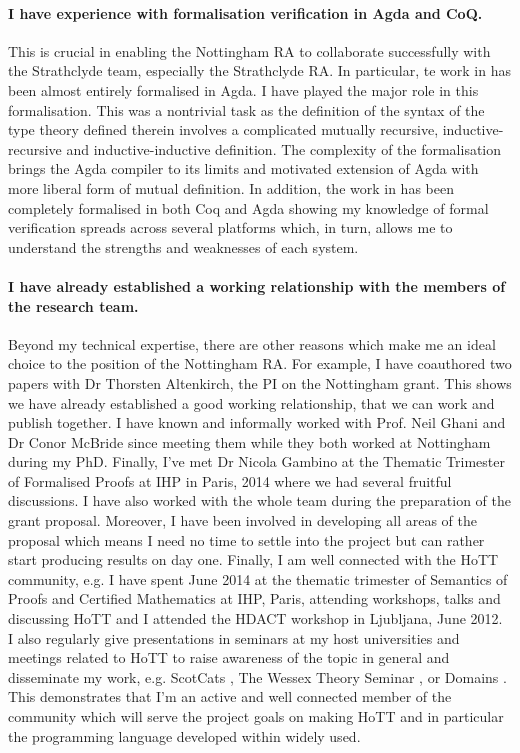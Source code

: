 \documentclass[a4paper]{article}
\begin{document}
\paragraph{I have experience with formalisation verification in Agda and
  CoQ.} This is crucial in enabling the Nottingham RA to collaborate
successfully with the Strathclyde team, especially the Strathclyde
RA. In particular, te work in
 has been almost
entirely formalised in Agda. I have played the major role in this
formalisation. This was a nontrivial task as the definition of the syntax of
the type theory defined therein involves a complicated mutually
recursive, inductive-recursive and inductive-inductive definition. The
complexity of the formalisation brings the Agda compiler to its limits
and motivated extension of Agda with more liberal form of mutual
definition. In addition, the work in  has been completely
formalised in both Coq and Agda showing my knowledge of formal
verification spreads across several platforms which, in turn, allows
me to understand the strengths and weaknesses of each system.
  

\paragraph{I have already established a working relationship with the
  members of the research team.} Beyond my technical expertise, there
are other reasons which make me an ideal choice to the position of the
Nottingham RA. For example, I have coauthored two papers with Dr
Thorsten Altenkirch, the PI on the Nottingham grant. This shows we have
already established a good working relationship, that we can work and
publish together. I have known and informally worked with Prof. Neil
Ghani and Dr Conor McBride since meeting them while they both worked
at Nottingham during my PhD. Finally, I've met Dr Nicola Gambino at the
Thematic Trimester of Formalised Proofs at IHP in Paris, 2014 where we
had several fruitful discussions. I have also worked with the whole team during
the preparation of the grant proposal. Moreover, I have  been involved
in developing all areas of the proposal which means I need no time to
settle into the project but can rather start producing results on day one.
Finally, I am well connected with the HoTT community, e.g.
I have spent June 2014 at the thematic trimester of Semantics of
Proofs and Certified Mathematics at IHP, Paris, attending workshops,
talks and discussing HoTT and I attended the HDACT workshop in Ljubljana, June 2012. 
I also regularly give presentations in seminars at my host universities and
meetings related to HoTT to raise awareness of the topic in general
and disseminate my work, e.g. ScotCats , The
Wessex Theory Seminar , or Domains .
This demonstrates that I'm an active and well connected member of
the community which will serve the project goals on making HoTT and in
particular the programming language developed within widely used.
\end{document}
